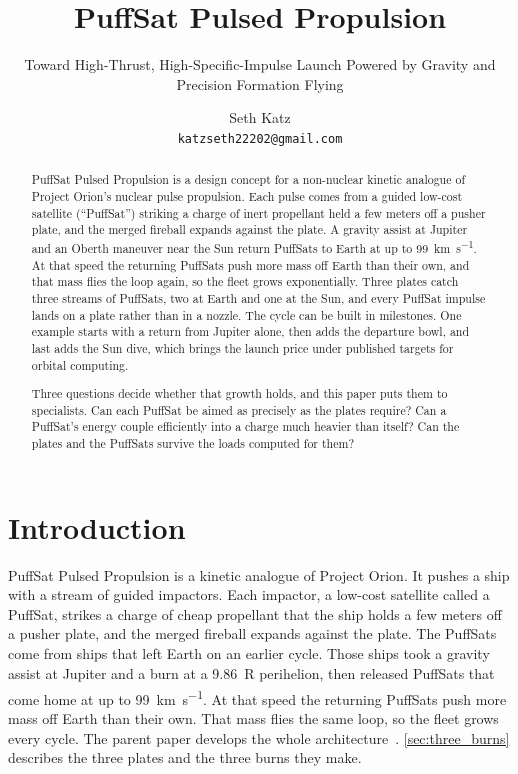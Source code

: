 \documentclass{article}
\title{PuffSat Pulsed Propulsion}
\subtitle{Toward High-Thrust, High-Specific-Impulse Launch Powered by Gravity and Precision Formation Flying}
\author{
  Seth Katz \\
  \texttt{katzseth22202@gmail.com} \\
}
\begin{document}
\maketitle

\begin{abstract}
PuffSat Pulsed Propulsion is a design concept for a non-nuclear kinetic analogue of Project Orion's nuclear pulse propulsion. Each pulse comes from a guided low-cost satellite (``PuffSat'') striking a charge of inert propellant held a few meters off a pusher plate, and the merged fireball expands against the plate. A gravity assist at Jupiter and an Oberth maneuver near the Sun return PuffSats to Earth at up to \SI{99}{\kilo\meter\per\second}. At that speed the returning PuffSats push more mass off Earth than their own, and that mass flies the loop again, so the fleet grows exponentially. Three plates catch three streams of PuffSats, two at Earth and one at the Sun, and every PuffSat impulse lands on a plate rather than in a nozzle. The cycle can be built in milestones. One example starts with a return from Jupiter alone, then adds the departure bowl, and last adds the Sun dive, which brings the launch price under published targets for orbital computing.

Three questions decide whether that growth holds, and this paper puts them to specialists. Can each PuffSat be aimed as precisely as the plates require? Can a PuffSat's energy couple efficiently into a charge much heavier than itself? Can the plates and the PuffSats survive the loads computed for them?
\end{abstract}

\section{Introduction}\label{sec:introduction}
PuffSat Pulsed Propulsion is a kinetic analogue of Project Orion. It pushes a ship with a stream of guided impactors. Each impactor, a low-cost satellite called a PuffSat, strikes a charge of cheap propellant that the ship holds a few meters off a pusher plate, and the merged fireball expands against the plate. The PuffSats come from ships that left Earth on an earlier cycle. Those ships took a gravity assist at Jupiter and a burn at a \SI{9.86}{R_\odot} perihelion, then released PuffSats that come home at up to \SI{99}{\kilo\meter\per\second}. At that speed the returning PuffSats push more mass off Earth than their own. That mass flies the same loop, so the fleet grows every cycle. The parent paper develops the whole architecture~\cite{katz2026aim}. \autoref{sec:three_burns} describes the three plates and the three burns they make.
\end{document}
